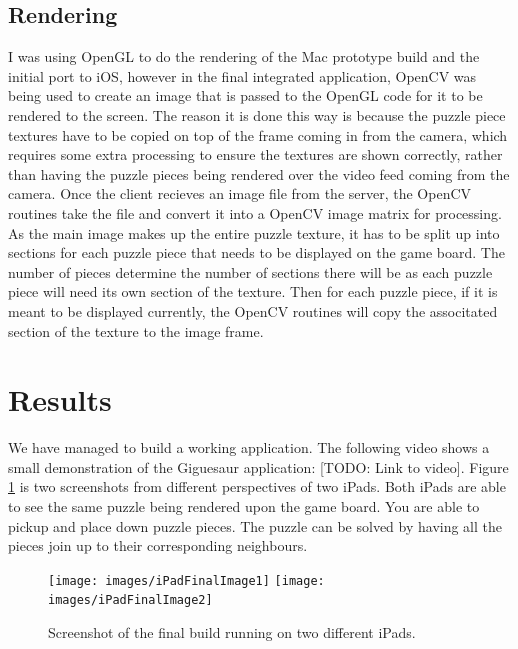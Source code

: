 \documentclass{article}
\begin{document}
\subsection{Rendering}
I was using OpenGL to do the rendering of the Mac prototype build and the
initial port to iOS, however in the final integrated application, OpenCV was
being used to create an image that is passed to the OpenGL code for it to be
rendered to the screen. The reason it is done this way is because the puzzle
piece textures have to be copied on top of the frame coming in from the
camera, which requires some extra processing to ensure the textures are shown
correctly, rather than having the puzzle pieces being rendered over the video
feed coming from the camera. Once the client recieves an image file from the
server, the OpenCV routines take the file and convert it into a OpenCV image
matrix for processing. As the main image makes up the entire puzzle texture, it
has to be split up into sections for each puzzle piece that needs to be
displayed on the game board. The number of pieces determine the number of
sections there will be as each puzzle piece will need its own section of the
texture. Then for each puzzle piece, if it is meant to be displayed currently,
the OpenCV routines will copy the associtated section of the texture to the
image frame.


\section{Results}
We have managed to build a working application. The following video shows a
small demonstration of the Giguesaur application: [TODO: Link to video]. Figure
\ref{fig:iPadFinal} is two screenshots from different perspectives of two
iPads. Both iPads are able to see the same puzzle being rendered upon the game
board. You are able to pickup and place down puzzle pieces. The puzzle can
be solved by having all the pieces join up to their corresponding neighbours.

\begin{figure}[ht]
\begin{center}
\texttt{[image: images/iPadFinalImage1]}
\texttt{[image: images/iPadFinalImage2]}
\caption{Screenshot of the final build running on two different iPads.}
\label{fig:iPadFinal}
\end{center}
\end{figure}
\end{document}
